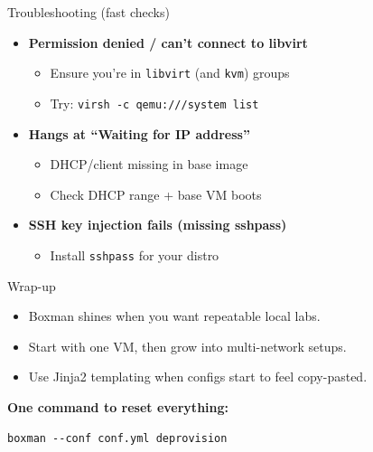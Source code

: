 \documentclass[aspectratio=169]{beamer}
\begin{document}
\begin{frame}[fragile]{Troubleshooting (fast checks)}
\begin{itemize}
  \item \textbf{Permission denied / can't connect to libvirt}
    \begin{itemize}
      \item Ensure you're in \texttt{libvirt} (and \texttt{kvm}) groups
      \item Try: \texttt{virsh -c qemu:///system list}
    \end{itemize}

  \item \textbf{Hangs at ``Waiting for IP address''}
    \begin{itemize}
      \item DHCP/client missing in base image
      \item Check DHCP range + base VM boots
    \end{itemize}

  \item \textbf{SSH key injection fails (missing sshpass)}
    \begin{itemize}
      \item Install \texttt{sshpass} for your distro
    \end{itemize}
\end{itemize}
\end{frame}

\begin{frame}[fragile]{Wrap-up}
\begin{itemize}
  \item Boxman shines when you want repeatable local labs.
  \item Start with one VM, then grow into multi-network setups.
  \item Use Jinja2 templating when configs start to feel copy-pasted.
\end{itemize}
\vspace{0.8em}
\textbf{One command to reset everything:}
\begin{lstlisting}[style=boxman]
boxman --conf conf.yml deprovision
\end{lstlisting}
\end{frame}
\end{document}
